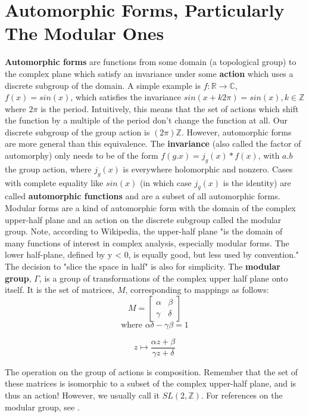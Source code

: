 \documentclass[11pt, oneside]{amsart}
\begin{document}
\section{Automorphic Forms, Particularly The Modular Ones}
\textbf{Automorphic forms} are functions from some domain (a topological group) to the complex plane which satisfy an invariance under some \textbf{action} which uses a discrete subgroup of the domain. A simple example is $f:\mathbb{R}\rightarrow\mathbb{C}$, $f(x)=sin(x)$, which satisfies the invariance $sin(x+k2\pi)=sin(x), k\in\mathbb{Z}$ where $2\pi$ is the period. Intuitively, this means that the set of actions which shift the function by a multiple of the period don't change the function at all. Our discrete subgroup of the group action is $(2\pi)\mathbb{Z}$. However, automorphic forms are more general than this equivalence. The \textbf{invariance} (also called the factor of automorphy) only needs to be of the form $f(g.x) = j_g(x)*f(x)$, with $a.b$ the group action, where $j_g(x)$ is everywhere holomorphic and nonzero. Cases with complete equality like $sin(x)$ (in which case $j_g(x)$ is the identity) are called \textbf{automorphic functions} and are a subset of all automorphic forms.
\\
Modular forms are a kind of automorphic form with the domain of the complex upper-half plane and an action on the discrete subgroup called the modular group. Note, according to Wikipedia, the upper-half plane "is the domain of many functions of interest in complex analysis, especially modular forms. The lower half-plane, defined by y < 0, is equally good, but less used by convention." The decision to "slice the space in half" is also for simplicity. The \textbf{modular group}, $\Gamma$, is a group of transformations of the complex upper half plane onto itself. It is the set of matrices, $M$, corresponding to mappings as follows:
\[
M=
\begin{bmatrix}

\alpha &	\beta \\
\gamma & \delta

\end{bmatrix}
\]
$$\text{where }\alpha\delta-\gamma\beta=1$$

\[
z \mapsto \frac{\alpha z + \beta}{\gamma z + \delta}
\]

The operation on the group of actions is composition. Remember that the set of these matrices is isomorphic to a subset of the complex upper-half plane, and is thus an action! However, we usually call it $SL(2, \mathbb{Z})$. For references on the modular group, see \cite{Stein}.
\end{document}
